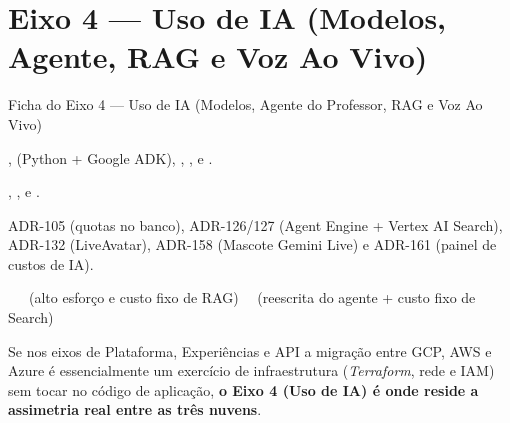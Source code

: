 \chapter{Eixo 4 --- Uso de IA (Modelos, Agente, RAG e Voz Ao Vivo)}
\label{cap:eixo-ia}

\begin{fichaeixo}{Ficha do Eixo 4 --- Uso de IA (Modelos, Agente do Professor, RAG e Voz Ao Vivo)}
\begin{campos}
  \item[Serviços no código] ,  (Python + Google ADK), , ,  e .
  \item[Arquivos Terraform] , ,  e .
  \item[Contratos e ADRs] ADR-105 (quotas no banco), ADR-126/127 (Agent Engine + Vertex AI Search), ADR-132 (LiveAvatar), ADR-158 (Mascote Gemini Live) e ADR-161 (painel de custos de IA).
  \item[Aderência por nuvem] \sgcp~\nativo \quad \saws~\adaptacao\ (alto esforço e custo fixo de RAG) \quad \sazure~\adaptacao\ (reescrita do agente + custo fixo de Search)
\end{campos}
\end{fichaeixo}

Se nos eixos de Plataforma, Experiências e API a migração entre GCP, AWS e Azure é essencialmente um exercício de infraestrutura (\emph{Terraform}, rede e IAM) sem tocar no código de aplicação, \textbf{o Eixo 4 (Uso de IA) é onde reside a assimetria real entre as três nuvens}.


